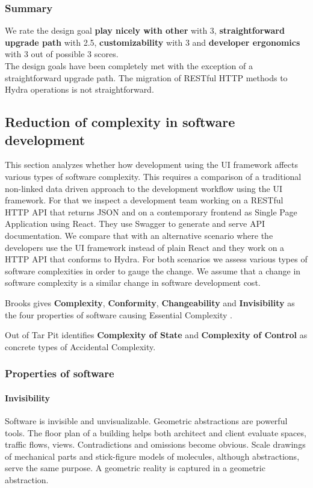 \subsubsection{Summary}
We rate the design goal \textbf{play nicely with other} with 3, \textbf{straightforward upgrade path} with 2.5, \textbf{customizability} with 3 and \textbf{developer ergonomics} with 3 out of possible 3 scores. \\ The design goals have been completely met with the exception of a straightforward upgrade path. The migration of RESTful HTTP methods to Hydra operations is not straightforward.

\subsection{Reduction of complexity in software development}
This section analyzes whether how development using the UI framework affects various types of software complexity. This requires a comparison of a traditional non-linked data driven approach to the development workflow using the UI framework. For that we inspect a development team working on a RESTful HTTP API that returns JSON and on a contemporary frontend as Single Page Application using React. They use Swagger to generate and serve API documentation. We compare that with an alternative scenario where the developers use the UI framework instead of plain React and they work on a HTTP API that conforms to Hydra. For both scenarios we assess various types of software complexities in order to gauge the change. We assume that a change in software complexity is a similar change in software development cost.

Brooks gives \textbf{Complexity}, \textbf{Conformity}, \textbf{Changeability} and \textbf{Invisibility} as the four properties of software causing Essential Complexity \citep{nosilverbullet}.

Out of Tar Pit identifies \textbf{Complexity of State} and \textbf{Complexity of Control} as concrete types of Accidental Complexity.

\subsubsection{Properties of software}

\paragraph{Invisibility}
Software is invisible and unvisualizable. Geometric abstractions are powerful tools. The floor plan of a building helps both architect and client evaluate spaces, traffic flows, views. Contradictions and omissions become obvious. Scale drawings of mechanical parts and stick-figure models of molecules, although abstractions, serve the same purpose. A geometric reality is captured in a geometric abstraction.

